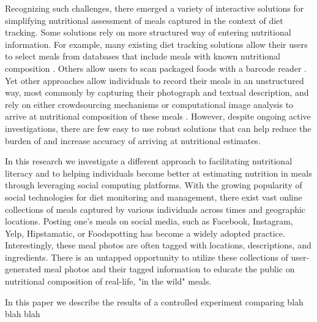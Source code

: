 

Recognizing such challenges, there emerged a variety of  interactive solutions for simplifying nutritional assessment of meals captured in the context of diet tracking. Some solutions rely on more structured way of entering nutritional information. For example, many existing diet tracking solutions allow their users to select meals from databases that include meals with known nutritional composition \cite{beijbom2015menu,kong2012dietcam,zhang2015snap,zhu2010use}. Others allow users to scan packaged foods with a barcode reader \cite{siek2009evaluation}. Yet other approaches allow individuals to record their meals in an unstructured way, most commonly by capturing their photograph and textual description, and rely on either crowdsourcing mechanisms \cite{noronha2011platemate} or computational image analysis to arrive at nutritional composition of these meals \cite{anthimopoulos2015computer,beijbom2015menu,kong2012dietcam,rhyner2016carbohydrate,zhang2015snap,zhu2010use}. However, despite ongoing active investigations, there are few easy to use robust solutions that can help reduce the burden of and increase accuracy of arriving at nutritional estimates.



In this research we investigate a different approach to facilitating nutritional literacy and to helping individuals become better at estimating nutrition in meals through leveraging social computing platforms. With the growing popularity of social technologies for diet monitoring and management, there exist vast online collections of meals captured by various individuals across times and geographic locations. Posting one's meals on social media, such as Facebook, Instagram, Yelp, Hipstamatic, or Foodspotting has become a widely adopted practice. Interestingly, these meal photos are often tagged with locations, descriptions, and ingredients. There is an untapped opportunity to utilize these collections of user-generated meal photos and their tagged information to educate the public on nutritional composition of real-life, "in the wild" meals.

In this paper we describe the results of a controlled experiment comparing blah blah blah 

